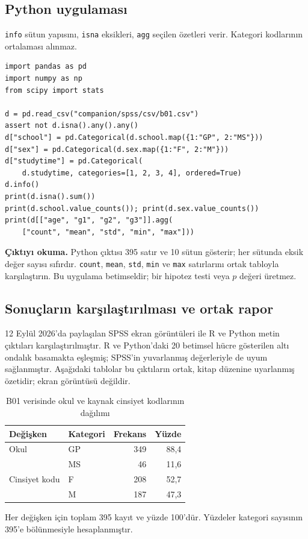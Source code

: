\par\noindent\begin{minipage}{\linewidth}
\subsection{Python uygulaması}
\label{sec:python-b01}

\texttt{info} sütun yapısını, \texttt{isna} eksikleri, \texttt{agg} seçilen özetleri verir. Kategori kodlarının ortalaması alınmaz.

\begin{lstlisting}[style=prismPythonApp]
import pandas as pd
import numpy as np
from scipy import stats

d = pd.read_csv("companion/spss/csv/b01.csv")
assert not d.isna().any().any()
d["school"] = pd.Categorical(d.school.map({1:"GP", 2:"MS"}))
d["sex"] = pd.Categorical(d.sex.map({1:"F", 2:"M"}))
d["studytime"] = pd.Categorical(
    d.studytime, categories=[1, 2, 3, 4], ordered=True)
d.info()
print(d.isna().sum())
print(d.school.value_counts()); print(d.sex.value_counts())
print(d[["age", "g1", "g2", "g3"]].agg(
    ["count", "mean", "std", "min", "max"]))
\end{lstlisting}

\textbf{Çıktıyı okuma.} Python çıktısı 395 satır ve 10 sütun gösterir;
her sütunda eksik değer sayısı sıfırdır. \texttt{count}, \texttt{mean},
\texttt{std}, \texttt{min} ve \texttt{max} satırlarını ortak tabloyla
karşılaştırın. Bu uygulama betimseldir; bir hipotez testi veya $p$ değeri
üretmez.
\end{minipage}\par

\subsection{Sonuçların karşılaştırılması ve ortak rapor}
12 Eylül 2026'da paylaşılan SPSS ekran görüntüleri ile R ve Python
metin çıktıları karşılaştırılmıştır. R ve Python'daki 20 betimsel hücre
gösterilen altı ondalık basamakta eşleşmiş; SPSS'in yuvarlanmış
değerleriyle de uyum sağlanmıştır. Aşağıdaki tablolar bu çıktıların
ortak, kitap düzenine uyarlanmış özetidir; ekran görüntüsü değildir.

\begin{table}[htbp]
\centering
\caption{B01 verisinde okul ve kaynak cinsiyet kodlarının dağılımı}
\label{tab:b01-dogrulanmis-frekans}
\begin{tabular}{@{}llrr@{}}
\toprule
Değişken & Kategori & Frekans & Yüzde \\
\midrule
Okul & GP & 349 & 88,4 \\
     & MS & 46 & 11,6 \\
\midrule
Cinsiyet kodu & F & 208 & 52,7 \\
              & M & 187 & 47,3 \\
\bottomrule
\end{tabular}
\par\smallskip
{\footnotesize Her değişken için toplam 395 kayıt ve yüzde 100'dür.
Yüzdeler kategori sayısının 395'e bölünmesiyle hesaplanmıştır.\par}
\end{table}

